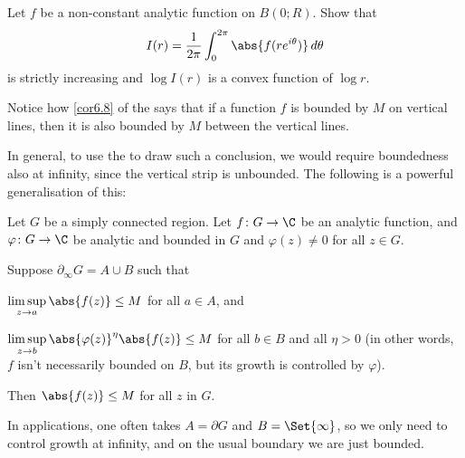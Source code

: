 \begin{exercise}
	Let $f$ be a non-constant analytic function on $B(0; R)$.
	Show that
	\[
		I(r) = \frac{1}{2 \pi} \int_0^{2 \pi} \abs{f(r e^{i \theta})} \, d \theta
	\]
	is strictly increasing and $\log I(r)$ is a convex function of $\log r$.
\end{exercise}

Notice how \autoref{cor6.8} of the  says that if a function $f$ is bounded by $M$ on vertical lines, then it is also bounded by $M$ between the vertical lines.

In general, to use the  to draw such a conclusion, we would require boundedness also at infinity, since the vertical strip is unbounded.
The following is a powerful generalisation of this:

\begin{theorem}\label{thm6.10}
	Let $G$ be a simply connected region.
	Let $f \colon G \to \C$ be an analytic function, and $\varphi \colon G \to \C$ be analytic and bounded in $G$ and $\varphi(z) \neq 0$ for all $z \in G$.

	Suppose $\partial_\infty G = A \cup B$ such that
	\begin{items}
		\item $\displaystyle \limsup_{z \to a} \abs{f(z)} \leq M$ for all $a \in A$, and
		\item $\displaystyle \limsup_{z \to b} \abs{\varphi(z)}^\eta \abs{f(z)} \leq M$ for all $b \in B$ and all $\eta > 0$ (in other words, $f$ isn't necessarily bounded on $B$, but its growth is controlled by $\varphi$).
	\end{items}
	Then $\abs{f(z)} \leq M$ for all $z$ in $G$.
\end{theorem}

\begin{remark}
	In applications, one often takes $A = \partial G$ and $B = \Set{\infty}$, so we only need to control growth at infinity, and on the usual boundary we are just bounded.
\end{remark}

